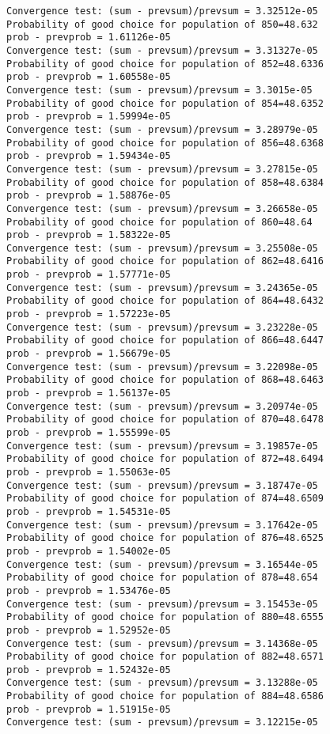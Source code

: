 \documentclass[11pt,onecolumn]{article}
\begin{document}
\begin{verbatim}
Convergence test: (sum - prevsum)/prevsum = 3.32512e-05
Probability of good choice for population of 850=48.632
prob - prevprob = 1.61126e-05
Convergence test: (sum - prevsum)/prevsum = 3.31327e-05
Probability of good choice for population of 852=48.6336
prob - prevprob = 1.60558e-05
Convergence test: (sum - prevsum)/prevsum = 3.3015e-05
Probability of good choice for population of 854=48.6352
prob - prevprob = 1.59994e-05
Convergence test: (sum - prevsum)/prevsum = 3.28979e-05
Probability of good choice for population of 856=48.6368
prob - prevprob = 1.59434e-05
Convergence test: (sum - prevsum)/prevsum = 3.27815e-05
Probability of good choice for population of 858=48.6384
prob - prevprob = 1.58876e-05
Convergence test: (sum - prevsum)/prevsum = 3.26658e-05
Probability of good choice for population of 860=48.64
prob - prevprob = 1.58322e-05
Convergence test: (sum - prevsum)/prevsum = 3.25508e-05
Probability of good choice for population of 862=48.6416
prob - prevprob = 1.57771e-05
Convergence test: (sum - prevsum)/prevsum = 3.24365e-05
Probability of good choice for population of 864=48.6432
prob - prevprob = 1.57223e-05
Convergence test: (sum - prevsum)/prevsum = 3.23228e-05
Probability of good choice for population of 866=48.6447
prob - prevprob = 1.56679e-05
Convergence test: (sum - prevsum)/prevsum = 3.22098e-05
Probability of good choice for population of 868=48.6463
prob - prevprob = 1.56137e-05
Convergence test: (sum - prevsum)/prevsum = 3.20974e-05
Probability of good choice for population of 870=48.6478
prob - prevprob = 1.55599e-05
Convergence test: (sum - prevsum)/prevsum = 3.19857e-05
Probability of good choice for population of 872=48.6494
prob - prevprob = 1.55063e-05
Convergence test: (sum - prevsum)/prevsum = 3.18747e-05
Probability of good choice for population of 874=48.6509
prob - prevprob = 1.54531e-05
Convergence test: (sum - prevsum)/prevsum = 3.17642e-05
Probability of good choice for population of 876=48.6525
prob - prevprob = 1.54002e-05
Convergence test: (sum - prevsum)/prevsum = 3.16544e-05
Probability of good choice for population of 878=48.654
prob - prevprob = 1.53476e-05
Convergence test: (sum - prevsum)/prevsum = 3.15453e-05
Probability of good choice for population of 880=48.6555
prob - prevprob = 1.52952e-05
Convergence test: (sum - prevsum)/prevsum = 3.14368e-05
Probability of good choice for population of 882=48.6571
prob - prevprob = 1.52432e-05
Convergence test: (sum - prevsum)/prevsum = 3.13288e-05
Probability of good choice for population of 884=48.6586
prob - prevprob = 1.51915e-05
Convergence test: (sum - prevsum)/prevsum = 3.12215e-05

\end{verbatim}
\end{document}
